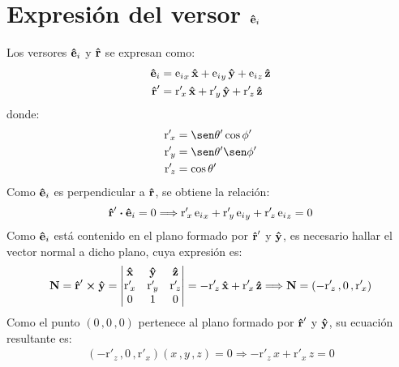 \section{Expresión del versor \texorpdfstring{$\bm{\mathbf{\hat{e}}}_i$}{text}}

Los versores $\bm{\mathbf{\hat{e}}}_i$ y $\bm{\mathbf{\hat{r}}}$ se expresan como:
\begin{align}
\bm{\mathbf{\hat{e}}}_i &= {\text{e}_i}_x\,\bm{\mathbf{\hat{x}}} + {\text{e}_i}_y\,\bm{\mathbf{\hat{y}}} + {\text{e}_i}_z\,\bm{\mathbf{\hat{z}}}
\label{ec_apD:1}\\
\bm{\mathbf{\hat{r}}}' &= {\text{r}'}_{\!x}\,\bm{\mathbf{\hat{x}}} + {\text{r}'}_{\!y}\,\bm{\mathbf{\hat{y}}} + {\text{r}'}_{\!z}\,\bm{\mathbf{\hat{z}}}
\label{ec_apD:2}
\end{align}
donde:
\begin{subequations}
\label{grup_ec_apD:1}
\begin{align}
{\text{r}'}_{\!x} &= \sen\theta '\cos\phi '
\label{ec_apD:3}\\
{\text{r}'}_{\!y} &= \sen\theta '\sen\phi '
\label{ec_apD:4}\\
{\text{r}'}_{\!z} &= \cos\theta '
\label{ec_apD:5}
\end{align}
\end{subequations}
Como $\bm{\mathbf{\hat{e}}}_i$ es perpendicular a $\bm{\mathbf{\hat{r}}}$, se obtiene la relación:
\begin{align}
\bm{\mathbf{\hat{r}}}'\boldsymbol{\cdot}\bm{\mathbf{\hat{e}}}_i = 0 \Longrightarrow {\text{r}'}_{\!x}\,{\text{e}_i}_x + {\text{r}'}_{\!y}\,{\text{e}_i}_y + {\text{r}'}_{\!z}\,{\text{e}_i}_z = 0
\label{ec_apD:6}
\end{align}
Como $\bm{\mathbf{\hat{e}}}_i$ está contenido en el plano formado por $\bm{\mathbf{\hat{r}}}'$ y $\bm{\mathbf{\hat{y}}}$, es necesario hallar el vector normal a dicho plano, cuya expresión es:
\begin{align}
\mathbf{N} = \bm{\mathbf{\hat{r}}}'\boldsymbol{\times}\bm{\mathbf{\hat{y}}} =
\begin{vmatrix}
\bm{\mathbf{\hat{x}}} & \bm{\mathbf{\hat{y}}} & \bm{\mathbf{\hat{z}}}\\
{\text{r}'}_{\!x} & {\text{r}'}_{\!y} & {\text{r}'}_{\!z}\\
0 & 1 & 0\\
\end{vmatrix}
= - {\text{r}'}_{\!z}\,\bm{\mathbf{\hat{x}}} + {\text{r}'}_{\!x}\,\bm{\mathbf{\hat{z}}} \Longrightarrow \mathbf{N} = \left(-{\text{r}'}_{\!z}\,,0\,,{\text{r}'}_{\!x}\right)
\label{ec_apD:7}
\end{align}
Como el punto $\left(0\,,0\,,0\right)$ pertenece al plano formado por $\bm{\mathbf{\hat{r}}}'$ y $\bm{\mathbf{\hat{y}}}$, su ecuación resultante es:
\begin{align}
\left(-{\text{r}'}_{\!z}\,,0\,,{\text{r}'}_{\!x}\right)\left(x\,,y\,,z\right) = 0 \Longrightarrow -{\text{r}'}_{\!z}\,x + {\text{r}'}_{\!x}\,z = 0
\label{ec_apD:8}
\end{align}
